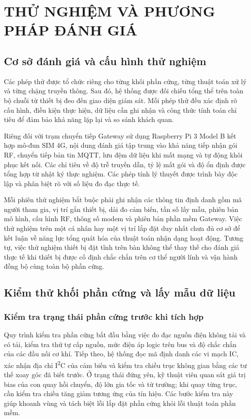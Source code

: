 \chapter{THỬ NGHIỆM VÀ PHƯƠNG PHÁP ĐÁNH GIÁ}\label{ch:kiemthu}

\section{Cơ sở đánh giá và cấu hình thử nghiệm}
Các phép thử được tổ chức riêng cho từng khối phần cứng, từng thuật toán xử lý và từng chặng truyền thông. Sau đó, hệ thống được đối chiếu tổng thể trên toàn bộ chuỗi từ thiết bị đeo đến giao diện giám sát. Mỗi phép thử đều xác định rõ cấu hình, điều kiện thực hiện, dữ liệu cần ghi nhận và công thức tính toán chỉ tiêu để đảm bảo khả năng lặp lại và so sánh khách quan.

Riêng đối với trạm chuyển tiếp Gateway sử dụng Raspberry Pi 3 Model B kết hợp mô-đun SIM 4G, nội dung đánh giá tập trung vào khả năng tiếp nhận gói RF, chuyển tiếp bản tin MQTT, lưu đệm dữ liệu khi mất mạng và tự động khôi phục kết nối. Các chỉ tiêu về độ trễ truyền dẫn, tỷ lệ mất gói và độ ổn định được tổng hợp từ nhật ký thực nghiệm. Các phép tính lý thuyết được trình bày độc lập và phân biệt rõ với số liệu đo đạc thực tế.

Mỗi phiên thử nghiệm bắt buộc phải ghi nhận các thông tin định danh gồm mã người tham gia, vị trí gắn thiết bị, dải đo cảm biến, tần số lấy mẫu, phiên bản mô hình, cấu hình RF, thông số modem và phiên bản phần mềm Gateway. Việc thử nghiệm trên một cá nhân hay một vị trí lắp đặt duy nhất chưa đủ cơ sở để kết luận về năng lực tổng quát hóa của thuật toán nhận dạng hoạt động. Tương tự, việc thử nghiệm thiết bị đặt tĩnh trên bàn không thể thay thế cho đánh giá thực tế khi thiết bị được cố định chắc chắn trên cơ thể người lính và vận hành đồng bộ cùng toàn bộ phần cứng.

\section{Kiểm thử khối phần cứng và lấy mẫu dữ liệu}\label{sec:testhardware}
\subsection{Kiểm tra trạng thái phần cứng trước khi tích hợp}
Quy trình kiểm tra phần cứng bắt đầu bằng việc đo đạc nguồn điện không tải và có tải, kiểm tra thứ tự cấp nguồn, mức điện áp logic trên bus và độ chắc chắn của các đầu nối cơ khí. Tiếp theo, hệ thống đọc mã định danh các vi mạch IC, xác nhận địa chỉ I\textsuperscript{2}C của cảm biến và kiểm tra chiều trục không gian bằng các tư thế xoay góc đã biết trước. Ở trạng thái đứng yên, kỹ thuật viên quan sát giá trị bias của con quay hồi chuyển, độ lớn gia tốc và từ trường; khi quay từng trục, cần kiểm tra chiều tăng giảm tương ứng của tín hiệu. Các bước kiểm tra này giúp khoanh vùng và tách biệt lỗi lắp đặt phần cứng khỏi lỗi thuật toán phần mềm.

